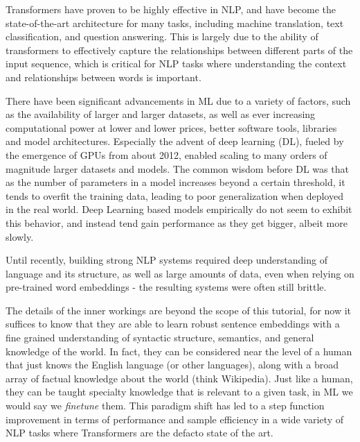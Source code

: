 Transformers have proven to be highly effective in NLP, and have become the state-of-the-art architecture for many tasks, including machine translation, text classification, and question answering.
This is largely due to the ability of transformers to effectively capture the relationships between different parts of the input sequence, which is critical for NLP tasks where understanding the context and relationships between words is important.

There have been significant advancements in ML due to a variety of factors, such as the availability of larger and larger datasets, as well as ever increasing computational power at lower and lower prices, better software tools, libraries and model architectures.
Especially the advent of deep learning (DL), fueled by the emergence of GPUs from about 2012, enabled scaling to many orders of magnitude larger datasets and models.
The common wisdom before DL was that as the number of parameters in a model increases beyond a certain threshold, it tends to overfit the training data, leading to poor generalization when deployed in the real world.
Deep Learning based models empirically do not seem to exhibit this behavior, and instead tend gain performance as they get bigger, albeit more slowly.

Until recently, building strong NLP systems required deep understanding of language and its structure, as well as large amounts of data, even when relying on pre-trained word embeddings - the resulting systems were often still brittle.


The details of the inner workings are beyond the scope of this tutorial, for now it suffices to know that they are able to learn robust sentence embeddings with a fine grained understanding of syntactic structure, semantics, and general knowledge of the world.
In fact, they can be considered near the level of a human that just knows the English language (or other languages), along with a broad array of factual knowledge about the world (think Wikipedia).
Just like a human, they can be taught specialty knowledge that is relevant to a given task, in ML we would say we \textit{finetune} them.
This paradigm shift has led to a step function improvement in terms of performance and sample efficiency in a wide variety of NLP tasks where Transformers are the defacto state of the art.

